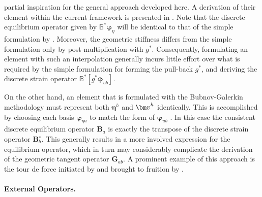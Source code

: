 partial inspiration for the general approach developed here.
A derivation of their
element within the current framework is presented in
\cite{perez2024nonlinear}. 
Note that the discrete equilibrium operator
given by \(\mathbb{B}^*\bm{\varphi}_{\eta}\) will be identical to that
of the simple formulation by \cite{simo1985finite}. %
Moreover, the geometric stiffness differs from 
the simple formulation only by post-multiplication with
\(g^*\).
Consequently, formulating an element with
such an interpolation generally incurs little effort
over what is
required by the simple formulation
for forming the pull-back \(g^*\), and deriving
the discrete strain operator
\(\mathbb{B}^*\left[g^*\bar{\bm{\varphi}}_{u b}\right]\).

On the other hand, an element that is formulated with the
Bubnov-Galerkin methodology must represent both \(\bm{\eta}^h\) and
\(\VarConfig^h\) identically. This is accomplished by choosing each basis
\(\bm{\varphi}_{\eta a}\) to match the form of \(\bm{\varphi}_{u b}\) .
In this case the consistent discrete equilibrium operator \(\bm{B}_a\)
is exactly the transpose of the discrete strain operator
\(\bm{B}^\star_b\). 
This generally results in a more involved expression for the 
equilibrium operator, which in turn may considerably complicate the
derivation of the geometric tangent operator \(\bm{G}_{ab}\).
A prominent example of this approach is the tour de
force initiated by \cite{cardona1988beam} and brought to fruition 
by \cite{ibrahimbegović1995computational}.


\paragraph{External Operators.}\label{sec:para-param}


